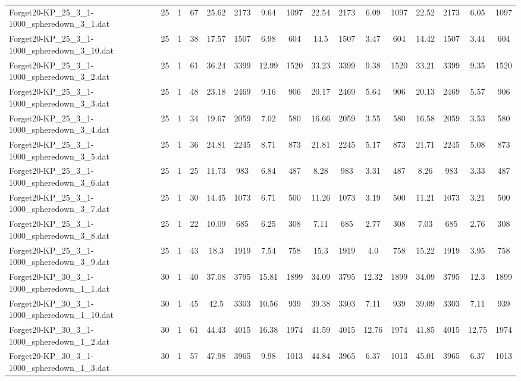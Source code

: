 \begin{sidewaystable}[!ht]
{\begin{tabular}{lccccccccccccccc}
Forget20-KP\_25\_3\_1-1000\_spheredown\_3\_1.dat & 25 & 1 & 67 & 25.62 & 2173 & 9.64 & 1097 & 22.54 & 2173 & 6.09 & 1097 & 22.52 & 2173 & 6.05 & 1097 \\
Forget20-KP\_25\_3\_1-1000\_spheredown\_3\_10.dat & 25 & 1 & 38 & 17.57 & 1507 & 6.98 & 604 & 14.5 & 1507 & 3.47 & 604 & 14.42 & 1507 & 3.44 & 604 \\
Forget20-KP\_25\_3\_1-1000\_spheredown\_3\_2.dat & 25 & 1 & 61 & 36.24 & 3399 & 12.99 & 1520 & 33.23 & 3399 & 9.38 & 1520 & 33.21 & 3399 & 9.35 & 1520 \\
Forget20-KP\_25\_3\_1-1000\_spheredown\_3\_3.dat & 25 & 1 & 48 & 23.18 & 2469 & 9.16 & 906 & 20.17 & 2469 & 5.64 & 906 & 20.13 & 2469 & 5.57 & 906 \\
Forget20-KP\_25\_3\_1-1000\_spheredown\_3\_4.dat & 25 & 1 & 34 & 19.67 & 2059 & 7.02 & 580 & 16.66 & 2059 & 3.55 & 580 & 16.58 & 2059 & 3.53 & 580 \\
Forget20-KP\_25\_3\_1-1000\_spheredown\_3\_5.dat & 25 & 1 & 36 & 24.81 & 2245 & 8.71 & 873 & 21.81 & 2245 & 5.17 & 873 & 21.71 & 2245 &  \textcolor{blue2}{5.08} & 873 \\
Forget20-KP\_25\_3\_1-1000\_spheredown\_3\_6.dat & 25 & 1 & 25 & 11.73 & 983 & 6.84 & 487 & 8.28 & 983 & 3.31 & 487 & 8.26 & 983 & 3.33 & 487 \\
Forget20-KP\_25\_3\_1-1000\_spheredown\_3\_7.dat & 25 & 1 & 30 & 14.45 & 1073 & 6.71 & 500 & 11.26 & 1073 & 3.19 & 500 & 11.21 & 1073 & 3.21 & 500 \\
Forget20-KP\_25\_3\_1-1000\_spheredown\_3\_8.dat & 25 & 1 & 22 & 10.09 & 685 & 6.25 & 308 & 7.11 & 685 & 2.77 & 308 & 7.03 & 685 & 2.76 & 308 \\
Forget20-KP\_25\_3\_1-1000\_spheredown\_3\_9.dat & 25 & 1 & 43 & 18.3 & 1919 & 7.54 & 758 & 15.3 & 1919 & 4.0 & 758 & 15.22 & 1919 & 3.95 & 758 \\
Forget20-KP\_30\_3\_1-1000\_spheredown\_1\_1.dat & 30 & 1 & 40 & 37.08 & 3795 & 15.81 & 1899 & 34.09 & 3795 & 12.32 & 1899 & 34.09 & 3795 & 12.3 & 1899 \\
Forget20-KP\_30\_3\_1-1000\_spheredown\_1\_10.dat & 30 & 1 & 45 & 42.5 & 3303 & 10.56 & 939 & 39.38 & 3303 & 7.11 & 939 & 39.09 & 3303 & 7.11 & 939 \\
Forget20-KP\_30\_3\_1-1000\_spheredown\_1\_2.dat & 30 & 1 & 61 & 44.43 & 4015 & 16.38 & 1974 & 41.59 & 4015 & 12.76 & 1974 & 41.85 & 4015 & 12.75 & 1974 \\
Forget20-KP\_30\_3\_1-1000\_spheredown\_1\_3.dat & 30 & 1 & 57 & 47.98 & 3965 & 9.98 & 1013 & 44.84 & 3965 & 6.37 & 1013 & 45.01 & 3965 & 6.37 & 1013 \\

\end{tabular}}
\end{sidewaystable}

